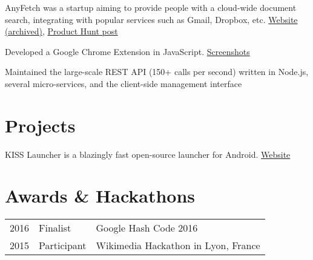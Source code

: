 \documentclass[
  english,
  a4paper
]{resume-openfont}
\begin{document}
\begin{minipage}[t]{0.66\textwidth}
%
%
AnyFetch was a startup aiming to provide people with a cloud-wide document search, integrating with popular services such as Gmail, Dropbox, etc. \href{https://i.imgur.com/B3MMD6Y.png}{Website (archived)}, \href{https://www.producthunt.com/posts/anyfetch}{Product Hunt post}
\vspace{\topsep}
\begin{tightemize}
\item Developed a Google Chrome Extension in JavaScript. \href{https://i.imgur.com/yql5v1z.png}{Screenshots}
\item Maintained the large-scale REST API (150+ calls per second) written in Node.js, several micro-services, and the client-side management interface
\end{tightemize}


\section{Projects}
%
%
KISS Launcher is a blazingly fast open-source launcher for Android. \href{http://kisslauncher.com/}{Website}
\sectionsep


\section{Awards \& Hackathons}
\begin{tabular}{@{}rll}
2016       & Finalist    & Google Hash Code 2016\\
2015	     & Participant & Wikimedia Hackathon in Lyon, France
\end{tabular}
\sectionsep

\end{minipage}
\end{document}
